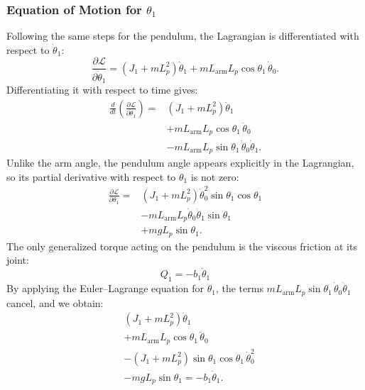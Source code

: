 \documentclass[a4paper,11pt]{article}
\newcommand{\La}{L_{\mathrm{arm}}}
\begin{document}
\subsubsection{Equation of Motion for \texorpdfstring{$\theta_1$}{theta1}}
Following the same steps for the pendulum, the Lagrangian is differentiated with respect to $\dot\theta_1$:
\begin{equation}
  \frac{\partial \mathcal{L}}{\partial \dot\theta_1} = \left(J_1 + m L_p^2\right)\dot\theta_1 + m \La L_p \cos\theta_1\,\dot\theta_0 .
\end{equation}
Differentiating it with respect to time gives:
\begin{equation}
\begin{aligned}
  \frac{d}{dt}\left(\frac{\partial \mathcal{L}}{\partial \dot\theta_1}\right) = {}& \left(J_1 + m L_p^2\right)\ddot\theta_1\\
  & + m \La L_p \cos\theta_1\,\ddot\theta_0\\
  & - m \La L_p \sin\theta_1\,\dot\theta_0 \dot\theta_1 .
\end{aligned}
\end{equation}
Unlike the arm angle, the pendulum angle appears explicitly in the Lagrangian, so its partial derivative with respect to $\theta_1$ is not zero:
\begin{equation}
\begin{aligned}
  \frac{\partial \mathcal{L}}{\partial \theta_1} = {}& \left(J_1 + m L_p^2\right)\dot\theta_0^2 \sin\theta_1 \cos\theta_1\\
  & - m \La L_p \dot\theta_0 \dot\theta_1 \sin\theta_1\\
  & + m g L_p \sin\theta_1 .
\end{aligned}
\end{equation}
The only generalized torque acting on the pendulum is the viscous friction at its joint:
\begin{equation}
  Q_1 = -b_1 \dot\theta_1
\end{equation}
By applying the Euler--Lagrange equation for $\theta_1$, the terms $m \La L_p \sin\theta_1\,\dot\theta_0 \dot\theta_1$ cancel, and we obtain:
\begin{equation}
\begin{aligned}
  & \left(J_1 + m L_p^2\right)\ddot\theta_1\\
  & + m \La L_p \cos\theta_1\,\ddot\theta_0\\
  & - \left(J_1 + m L_p^2\right)\sin\theta_1 \cos\theta_1\,\dot\theta_0^2\\
  & - m g L_p \sin\theta_1 = -b_1 \dot\theta_1 .
\end{aligned}
\end{equation}
\end{document}
